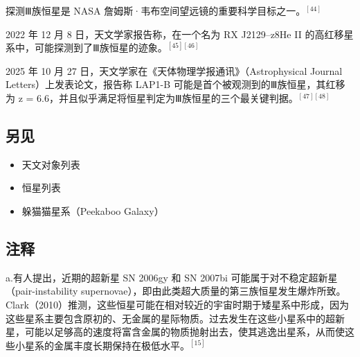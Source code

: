探测Ⅲ族恒星是 NASA 詹姆斯·韦布空间望远镜的重要科学目标之一。$^{[44]}$

2022 年 12 月 8 日，天文学家报告称，在一个名为 RX J2129–z8He II 的高红移星系中，可能探测到了Ⅲ族恒星的迹象。$^{[45][46]}$

2025 年 10 月 27 日，天文学家在《天体物理学报通讯》（Astrophysical Journal Letters）上发表论文，报告称 LAP1-B 可能是首个被观测到的Ⅲ族恒星，其红移为 z = 6.6，并且似乎满足将恒星判定为Ⅲ族恒星的三个最关键判据。$^{[47][48]}$
\subsection{另见}
\begin{itemize}
\item 天文对象列表
\item 恒星列表
\item 躲猫猫星系（Peekaboo Galaxy）
\end{itemize}
\subsection{注释}
a.有人提出，近期的超新星 SN 2006gy 和 SN 2007bi 可能属于对不稳定超新星（pair-instability supernovae），即由此类超大质量的第三族恒星发生爆炸所致。Clark（2010）推测，这些恒星可能在相对较近的宇宙时期于矮星系中形成，因为这些星系主要包含原初的、无金属的星际物质。过去发生在这些小星系中的超新星，可能以足够高的速度将富含金属的物质抛射出去，使其逃逸出星系，从而使这些小星系的金属丰度长期保持在极低水平。$^{[15]}$
